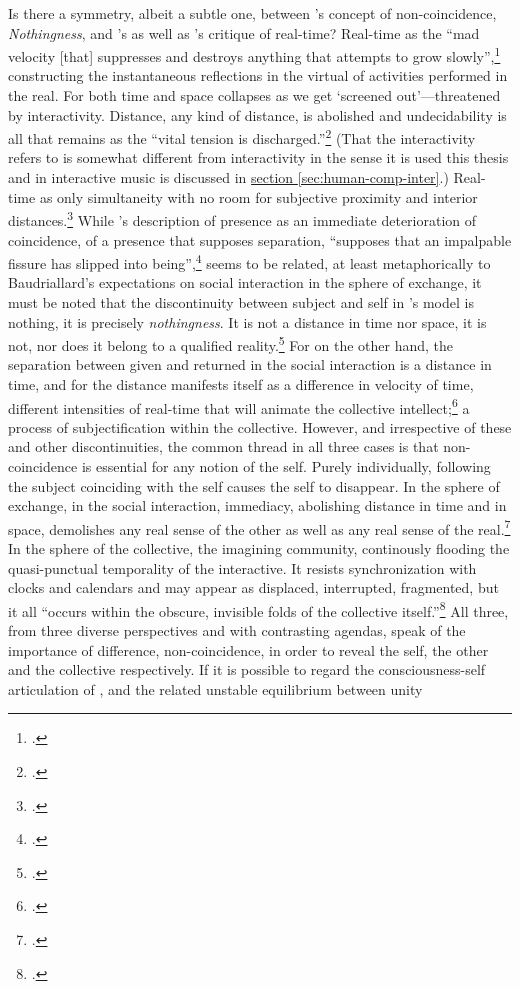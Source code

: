 Is there a symmetry, albeit a subtle one, between \citeauthor{sartre43}'s concept of non-coincidence, \emph{Nothingness}, and \citeauthor{baudrillard02}'s as well as \citeauthor{levy97}'s critique of real-time? Real-time as the ``mad velocity [that] suppresses and destroys anything that attempts to grow slowly'',\footcite[180]{levy97} constructing the instantaneous reflections in the virtual of activities performed in the real. For \citeauthor{baudrillard02} both time and space collapses as we get `screened out'---threatened by interactivity. Distance, any kind of distance, is abolished and undecidability is all that remains as the ``vital tension is discharged.''\footcite[176]{baudrillard02} (That the interactivity \citeauthor{baudrillard02} refers to is somewhat different from interactivity in the sense it is used this thesis and in interactive music is discussed in \hyperlink{sec:target:human-comp-inter:par4}{section \ref*{sec:human-comp-inter}}.) Real-time as only simultaneity with no room for subjective proximity and interior distances.\footcite[182]{levy97} While \citeauthor{sartre43}'s description of presence as an immediate deterioration of coincidence, of a presence that supposes separation, ``supposes that an impalpable fissure has slipped into being'',\footcite[101]{sartre43} seems to be related, at least metaphorically to Baudriallard's expectations on social interaction in the sphere of exchange, it must be noted that the discontinuity between subject and self in \citeauthor{sartre43}'s model is nothing, it is precisely \emph{nothingness}. It is not a distance in time nor space, it is not, nor does it belong to a qualified reality.\footcite[See][101]{sartre43} For \citeauthor{baudrillard02:screened} on the other hand, the separation between given and returned in the social interaction is a distance in time, and for \citeauthor{levy97} the distance manifests itself as a difference in velocity of time, different intensities of real-time that will animate the collective intellect;\footcite[See][179]{levy97} a process of subjectification within the collective. However, and irrespective of these and other discontinuities, the common thread in all three cases is that non-coincidence is essential for any notion of the self. Purely individually, following \citeauthor{sartre43} the subject coinciding with the self causes the self to disappear. In the sphere of exchange, in the social interaction, immediacy, abolishing distance in time and in space, demolishes any real sense of the other as well as any real sense of the real.\footcites[See][]{baudrillard96:writing}[See also][]{baudrillard02:screened} In the sphere of the collective, the imagining community, continously flooding the quasi-punctual temporality of the interactive. It resists synchronization with clocks and calendars and may appear as displaced, interrupted, fragmented, but it all ``occurs within the obscure, invisible folds of the collective itself.''\footcite[126]{levy97} All three, from three diverse perspectives and with contrasting agendas, speak of the importance of difference, non-coincidence, in order to reveal the self, the other and the collective respectively. If it is possible to regard the consciousness-self articulation of \citeauthor{sartre43}, and the related unstable equilibrium between unity 